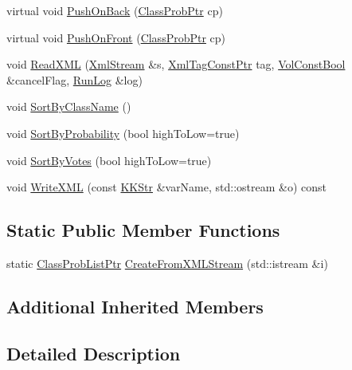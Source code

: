 \begin{DoxyCompactItemize}
virtual void \hyperlink{class_k_k_m_l_l_1_1_class_prob_list_a9fd88e9e49fd9b46142f1557d74e56ed}{Push\+On\+Back} (\hyperlink{namespace_k_k_m_l_l_aac4f1402b049fe046f3fa6c789a0c5d0}{Class\+Prob\+Ptr} cp)
\item 
virtual void \hyperlink{class_k_k_m_l_l_1_1_class_prob_list_a723a2559550b4ebcd151e4939f9bc7b6}{Push\+On\+Front} (\hyperlink{namespace_k_k_m_l_l_aac4f1402b049fe046f3fa6c789a0c5d0}{Class\+Prob\+Ptr} cp)
\item 
void \hyperlink{class_k_k_m_l_l_1_1_class_prob_list_ae64a4db4cbc2922f5265dbdbeba3c338}{Read\+X\+ML} (\hyperlink{class_k_k_b_1_1_xml_stream}{Xml\+Stream} \&s, \hyperlink{namespace_k_k_b_a5f1b0b1667d79fec26deeff10c43df23}{Xml\+Tag\+Const\+Ptr} tag, \hyperlink{namespace_k_k_b_a7d390f568e2831fb76b86b56c87bf92f}{Vol\+Const\+Bool} \&cancel\+Flag, \hyperlink{class_k_k_b_1_1_run_log}{Run\+Log} \&log)
\item 
void \hyperlink{class_k_k_m_l_l_1_1_class_prob_list_a67ebea1263fa112597b8bc1275a7cc32}{Sort\+By\+Class\+Name} ()
\item 
void \hyperlink{class_k_k_m_l_l_1_1_class_prob_list_ac398f0d6991ead17d970a5b085b3eaed}{Sort\+By\+Probability} (bool high\+To\+Low=true)
\item 
void \hyperlink{class_k_k_m_l_l_1_1_class_prob_list_ab6eaf7cd82af0befd522fc9b57c9f8b2}{Sort\+By\+Votes} (bool high\+To\+Low=true)
\item 
void \hyperlink{class_k_k_m_l_l_1_1_class_prob_list_abb8848cedbdfce81ffbee6663c5c6dec}{Write\+X\+ML} (const \hyperlink{class_k_k_b_1_1_k_k_str}{K\+K\+Str} \&var\+Name, std\+::ostream \&o) const 
\end{DoxyCompactItemize}
\subsection*{Static Public Member Functions}
\begin{DoxyCompactItemize}
\item 
static \hyperlink{class_k_k_m_l_l_1_1_class_prob_list_ae410f9bc9ad2f68c9587ec2ceedb82bd}{Class\+Prob\+List\+Ptr} \hyperlink{class_k_k_m_l_l_1_1_class_prob_list_a76c5829ccf9f017310597ee96cfbf474}{Create\+From\+X\+M\+L\+Stream} (std\+::istream \&i)
\end{DoxyCompactItemize}
\subsection*{Additional Inherited Members}


\subsection{Detailed Description}


